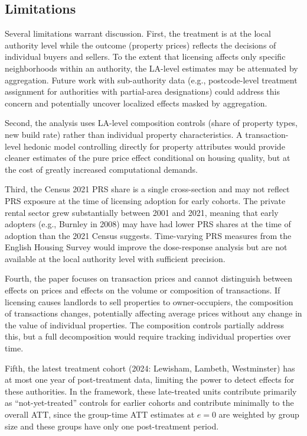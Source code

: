 \documentclass[12pt]{article}
\begin{document}
\subsection{Limitations}

Several limitations warrant discussion. First, the treatment is at the local authority level while the outcome (property prices) reflects the decisions of individual buyers and sellers. To the extent that licensing affects only specific neighborhoods within an authority, the LA-level estimates may be attenuated by aggregation. Future work with sub-authority data (e.g., postcode-level treatment assignment for authorities with partial-area designations) could address this concern and potentially uncover localized effects masked by aggregation.

Second, the analysis uses LA-level composition controls (share of property types, new build rate) rather than individual property characteristics. A transaction-level hedonic model controlling directly for property attributes would provide cleaner estimates of the pure price effect conditional on housing quality, but at the cost of greatly increased computational demands.

Third, the Census 2021 PRS share is a single cross-section and may not reflect PRS exposure at the time of licensing adoption for early cohorts. The private rental sector grew substantially between 2001 and 2021, meaning that early adopters (e.g., Burnley in 2008) may have had lower PRS shares at the time of adoption than the 2021 Census suggests. Time-varying PRS measures from the English Housing Survey would improve the dose-response analysis but are not available at the local authority level with sufficient precision.

Fourth, the paper focuses on transaction prices and cannot distinguish between effects on prices and effects on the volume or composition of transactions. If licensing causes landlords to sell properties to owner-occupiers, the composition of transactions changes, potentially affecting average prices without any change in the value of individual properties. The composition controls partially address this, but a full decomposition would require tracking individual properties over time.

Fifth, the latest treatment cohort (2024: Lewisham, Lambeth, Westminster) has at most one year of post-treatment data, limiting the power to detect effects for these authorities. In the \citet{callaway2021difference} framework, these late-treated units contribute primarily as ``not-yet-treated'' controls for earlier cohorts and contribute minimally to the overall ATT, since the group-time ATT estimates at $e = 0$ are weighted by group size and these groups have only one post-treatment period.
\end{document}

